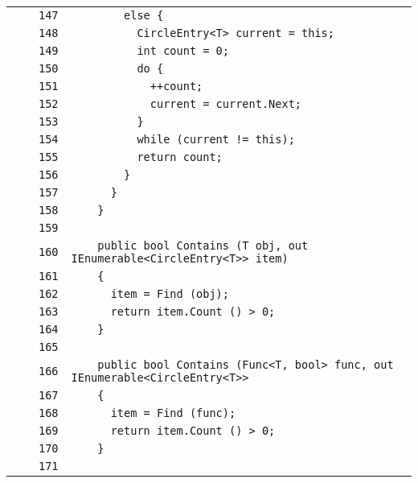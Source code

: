 \documentclass[a4paper,10pt]{article}
\begin{document}
\begin{longtable}[l]{lrrl}
\cellcolor{gray} &  & \verb~147~ & \verb~        else {~\\
\cellcolor{gray} &  & \verb~148~ & \verb~          CircleEntry<T> current = this;~\\
\cellcolor{gray} &  & \verb~149~ & \verb~          int count = 0;~\\
\cellcolor{gray} &  & \verb~150~ & \verb~          do {~\\
\cellcolor{gray} &  & \verb~151~ & \verb~            ++count;~\\
\cellcolor{gray} &  & \verb~152~ & \verb~            current = current.Next;~\\
\cellcolor{gray} &  & \verb~153~ & \verb~          }~\\
\cellcolor{gray} &  & \verb~154~ & \verb~          while (current != this);~\\
\cellcolor{gray} &  & \verb~155~ & \verb~          return count;~\\
\cellcolor{gray} &  & \verb~156~ & \verb~        }~\\
\cellcolor{gray} &  & \verb~157~ & \verb~      }~\\
\cellcolor{gray} &  & \verb~158~ & \verb~    }~\\
\cellcolor{gray} &  & \verb~159~ & \verb~~\\
\cellcolor{gray} &  & \verb~160~ & \verb~    public bool Contains (T obj, out IEnumerable<CircleEntry<T>> item)~\\
\cellcolor{gray} &  & \verb~161~ & \verb~    {~\\
\cellcolor{gray} &  & \verb~162~ & \verb~      item = Find (obj);~\\
\cellcolor{gray} &  & \verb~163~ & \verb~      return item.Count () > 0;~\\
\cellcolor{gray} &  & \verb~164~ & \verb~    }~\\
\cellcolor{gray} &  & \verb~165~ & \verb~~\\
\cellcolor{gray} &  & \verb~166~ & \verb~    public bool Contains (Func<T, bool> func, out IEnumerable<CircleEntry<T>> ~\\
\cellcolor{gray} &  & \verb~167~ & \verb~    {~\\
\cellcolor{gray} &  & \verb~168~ & \verb~      item = Find (func);~\\
\cellcolor{gray} &  & \verb~169~ & \verb~      return item.Count () > 0;~\\
\cellcolor{gray} &  & \verb~170~ & \verb~    }~\\
\cellcolor{gray} &  & \verb~171~ & \verb~~\\

\end{longtable}
\end{document}
